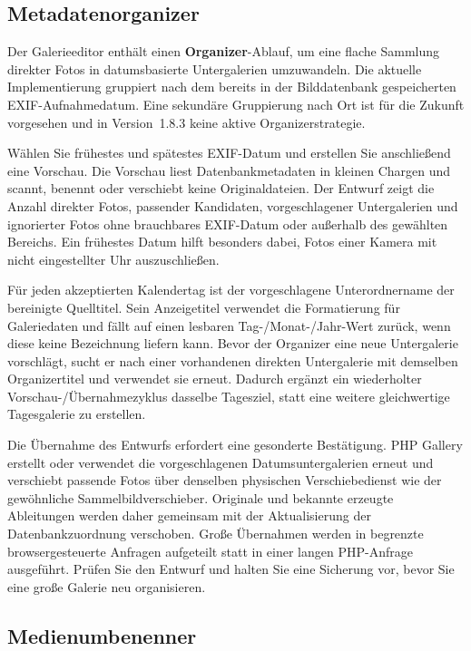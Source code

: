 \documentclass[11pt,a4paper]{article}
\newcommand{\version}{1.8.3}
\newcommand{\ui}[1]{\textbf{#1}}
\begin{document}
\subsection{Metadatenorganizer}

Der Galerieeditor enthält einen \ui{Organizer}-Ablauf, um eine flache Sammlung
direkter Fotos in datumsbasierte Untergalerien umzuwandeln. Die aktuelle
Implementierung gruppiert nach dem bereits in der Bilddatenbank gespeicherten
EXIF-Aufnahmedatum. Eine sekundäre Gruppierung nach Ort ist für die Zukunft
vorgesehen und in Version~\version{} keine aktive Organizerstrategie.

Wählen Sie frühestes und spätestes EXIF-Datum und erstellen Sie anschließend
eine Vorschau. Die Vorschau liest Datenbankmetadaten in kleinen Chargen und
scannt, benennt oder verschiebt keine Originaldateien. Der Entwurf zeigt die
Anzahl direkter Fotos, passender Kandidaten, vorgeschlagener Untergalerien und
ignorierter Fotos ohne brauchbares EXIF-Datum oder außerhalb des gewählten
Bereichs. Ein frühestes Datum hilft besonders dabei, Fotos einer Kamera mit
nicht eingestellter Uhr auszuschließen.

Für jeden akzeptierten Kalendertag ist der vorgeschlagene Unterordnername der
bereinigte Quelltitel. Sein Anzeigetitel verwendet die Formatierung für
Galeriedaten und fällt auf einen lesbaren Tag-/Monat-/Jahr-Wert zurück, wenn
diese keine Bezeichnung liefern kann. Bevor der Organizer eine neue Untergalerie
vorschlägt, sucht er nach einer vorhandenen direkten Untergalerie mit demselben
Organizertitel und verwendet sie erneut. Dadurch ergänzt ein wiederholter
Vorschau-/Übernahmezyklus dasselbe Tagesziel, statt eine weitere gleichwertige
Tagesgalerie zu erstellen.

Die Übernahme des Entwurfs erfordert eine gesonderte Bestätigung. PHP Gallery
erstellt oder verwendet die vorgeschlagenen Datumsuntergalerien erneut und
verschiebt passende Fotos über denselben physischen Verschiebedienst wie der
gewöhnliche Sammelbildverschieber. Originale und bekannte erzeugte Ableitungen
werden daher gemeinsam mit der Aktualisierung der Datenbankzuordnung verschoben.
Große Übernahmen werden in begrenzte browsergesteuerte Anfragen aufgeteilt statt
in einer langen PHP-Anfrage ausgeführt. Prüfen Sie den Entwurf und halten Sie
eine Sicherung vor, bevor Sie eine große Galerie neu organisieren.

\subsection{Medienumbenenner}
\end{document}
